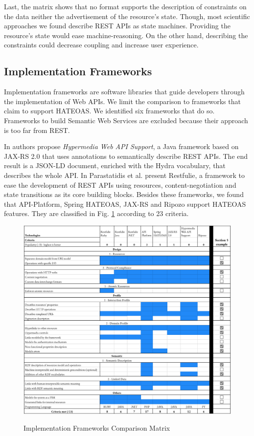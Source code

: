 Last, the matrix shows that no format supports the description of constraints on the data neither the advertisement of the resource's state. Though, most scientific approaches we found describe REST APIs as state machines. Providing the resource's state would ease machine-reasoning. On the other hand, describing the constraints could decrease coupling and increase user experience. %

\subsection{Implementation Frameworks}

Implementation frameworks are software libraries that guide developers through the implementation of Web APIs. We limit the comparison to frameworks that claim to support HATEOAS. We identified six frameworks that do so. Frameworks to build Semantic Web Services are excluded because their approach is too far from REST.

In \cite{salvadori2014framework} authors propose \textit{Hypermedia Web API Support}, a Java framework based on JAX-RS 2.0 that uses annotations to semantically describe REST APIs. The end result is a JSON-LD document, enriched with the Hydra vocabulary, that describes the whole API. In \cite{parastatidis2010role} Parastatidis et al. present Restfulie, a framework to ease the development of REST APIs using resources, content-negotiation and state transitions as its core building blocks. Besides these frameworks, we found that API-Platform, Spring HATEOAS, JAX-RS and Ripozo support HATEOAS features. They are classified in Fig. \ref{frameworks-matrix} according to 23 criteria.

\begin{figure}[ht]
\caption{Implementation Frameworks Comparison Matrix}
\includegraphics[width=1\textwidth]{figures/frameworks.png}
\label{frameworks-matrix}
\end{figure}

